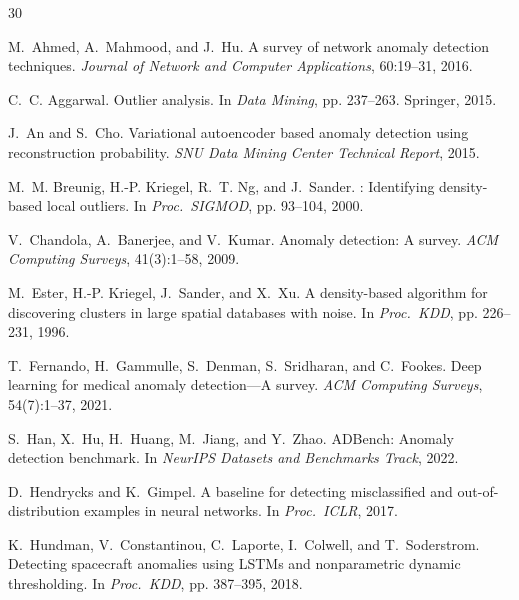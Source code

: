\documentclass{article}
\begin{document}
\begin{thebibliography}{30}

M.~Ahmed, A.~Mahmood, and J.~Hu.
\newblock A survey of network anomaly detection techniques.
\newblock \emph{Journal of Network and Computer Applications}, 60:19--31, 2016.

C.~C. Aggarwal.
\newblock Outlier analysis.
\newblock In \emph{Data Mining}, pp. 237--263. Springer, 2015.

J.~An and S.~Cho.
\newblock Variational autoencoder based anomaly detection using reconstruction probability.
\newblock \emph{SNU Data Mining Center Technical Report}, 2015.

M.~M. Breunig, H.-P. Kriegel, R.~T. Ng, and J.~Sander.
: Identifying density-based local outliers.
\newblock In \emph{Proc.\ SIGMOD}, pp. 93--104, 2000.

V.~Chandola, A.~Banerjee, and V.~Kumar.
\newblock Anomaly detection: A survey.
\newblock \emph{ACM Computing Surveys}, 41(3):1--58, 2009.

M.~Ester, H.-P. Kriegel, J.~Sander, and X.~Xu.
\newblock A density-based algorithm for discovering clusters in large spatial databases with noise.
\newblock In \emph{Proc.\ KDD}, pp. 226--231, 1996.

T.~Fernando, H.~Gammulle, S.~Denman, S.~Sridharan, and C.~Fookes.
\newblock Deep learning for medical anomaly detection---A survey.
\newblock \emph{ACM Computing Surveys}, 54(7):1--37, 2021.

S.~Han, X.~Hu, H.~Huang, M.~Jiang, and Y.~Zhao.
\newblock ADBench: Anomaly detection benchmark.
\newblock In \emph{NeurIPS Datasets and Benchmarks Track}, 2022.

D.~Hendrycks and K.~Gimpel.
\newblock A baseline for detecting misclassified and out-of-distribution examples in neural networks.
\newblock In \emph{Proc.\ ICLR}, 2017.

K.~Hundman, V.~Constantinou, C.~Laporte, I.~Colwell, and T.~Soderstrom.
\newblock Detecting spacecraft anomalies using {LSTM}s and nonparametric dynamic thresholding.
\newblock In \emph{Proc.\ KDD}, pp. 387--395, 2018.


\end{thebibliography}
\end{document}
